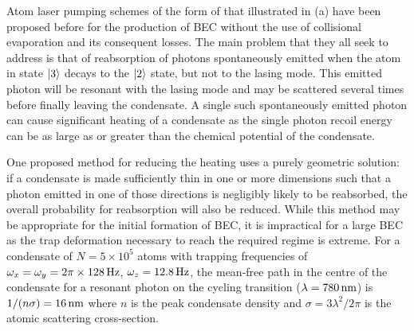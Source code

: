 Atom laser pumping schemes of the form of that illustrated in (a) have been proposed before \citep{Olshanii:1996,Janicke:1996,Spreeuw:1995,Cirac:1996rr,Cirac:1996,Santos:2000,Castin:1998,Cirac:1994,Vengalattore:2003,Santos:2001ve,Wolf:2000,Santos:1999qf} for the production of BEC without the use of collisional evaporation and its consequent losses.  The main problem that they all seek to address is that of reabsorption of photons spontaneously emitted when the atom in state ${\left|3\right>}$ decays to the ${\left|2\right>}$ state, but not to the lasing mode.  This emitted photon will be resonant with the lasing mode and may be scattered several times before finally leaving the condensate.  A single such spontaneously emitted photon can cause significant heating of a condensate as the single photon recoil energy can be as large as or greater than the chemical potential of the condensate.

One proposed method \citep{Castin:1998,Vengalattore:2003} for reducing the heating uses a purely geometric solution: if a condensate is made sufficiently thin in one or more dimensions such that a photon emitted in one of those directions is negligibly likely to be reabsorbed, the overall probability for reabsorption will also be reduced.  While this method may be appropriate for the initial formation of BEC, it is impractical for a large BEC as the trap deformation necessary to reach the required regime is extreme.  For a  condensate of $N= 5\times 10^5$ atoms with trapping frequencies of $\omega_x = \omega_y = \unit[2\pi \times 128]{Hz}$, $\omega_z = \unit[12.8]{Hz}$, the mean-free path in the centre of the condensate for a resonant photon on the cycling transition ($\lambda = \unit[780]{nm}$) is $1/(n \sigma) = \unit[16]{nm}$ where $n$ is the peak condensate density and $\sigma = 3 \lambda^2/2 \pi$ is the atomic scattering cross-section.


